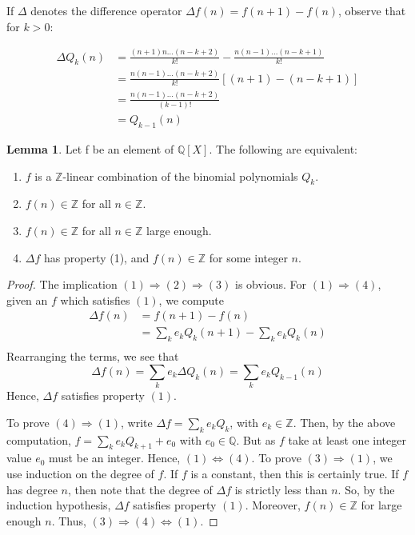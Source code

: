 \documentclass[11pt]{amsart}
\newcommand{\Q}{{\mathbb Q}}
\newcommand{\Z}{{\mathbb Z}}
\theoremstyle{definition}
\newtheorem{lemma}[theorem]{Lemma}
\begin{document}
If $\Delta$ denotes the difference operator $\Delta f(n)=f(n+1)-f(n)$, observe that for $k> 0$:

\begin{align*}
\Delta Q_k(n) &= \frac{(n+1)n\ldots(n-k+2)}{k!} - \frac{n(n-1)\ldots(n-k+1)}{k!}\\
&= \frac{n(n-1)\ldots(n-k+2)}{k!}[(n+1)- (n-k+1)]\\
&= \frac{n(n-1)\ldots(n-k+2)}{(k-1)!}\\
&= Q_{k-1}(n)
\end{align*}

\begin{lemma}
	Let f be an element of $\Q[X]$. The following are equivalent:
	\begin{enumerate}
		\item $f$ is a $\Z$-linear combination of the binomial polynomials $Q_k$.
		\item $f(n)\in \Z$ for all $n\in\Z$.
		\item $f(n)\in \Z$ for all $n\in\Z$ large enough.
		\item $\Delta f$ has property (1), and $f(n)\in\Z$ for some integer $n$.
	\end{enumerate}
\end{lemma}
\begin{proof}
	The implication $(1)\Rightarrow (2)\Rightarrow (3)$ is obvious. For $(1)\Rightarrow (4)$, given an $f$ which satisfies $(1)$, we compute
	\begin{align*}
	\Delta f(n) &= f(n+1) - f(n)\\
	&= \sum_k e_k Q_k (n+1) - \sum_k e_k Q_k(n)\\
	\end{align*}
	Rearranging the terms, we see that
	\[\Delta f(n)= \sum_k e_k \Delta Q_k(n)=\sum_k e_k Q_{k-1}(n)\]
	Hence, $\Delta f$ satisfies property $(1)$.
	
	To prove $(4)\Rightarrow (1)$, write $\Delta f = \sum_k e_k Q_k$, with $e_k\in \Z$. Then, by the above computation, $f=\sum_k e_k Q_{k+1} + e_0$ with $e_0\in \Q$. But as $f$ take at least one integer value $e_0$ must be an integer. Hence, $(1)\Leftrightarrow (4)$.	
	To prove $(3)\Rightarrow (1)$, we use induction on the degree of $f$. If $f$ is a constant, then this is certainly true. If $f$ has degree $n$, then note that the degree of $\Delta f$ is strictly less than $n$. So, by the induction hypothesis, $\Delta f$ satisfies property $(1)$. Moreover, $f(n)\in \Z$ for large enough $n$. Thus, $(3)\Rightarrow (4)\Leftrightarrow (1)$.
\end{proof}
\end{document}
